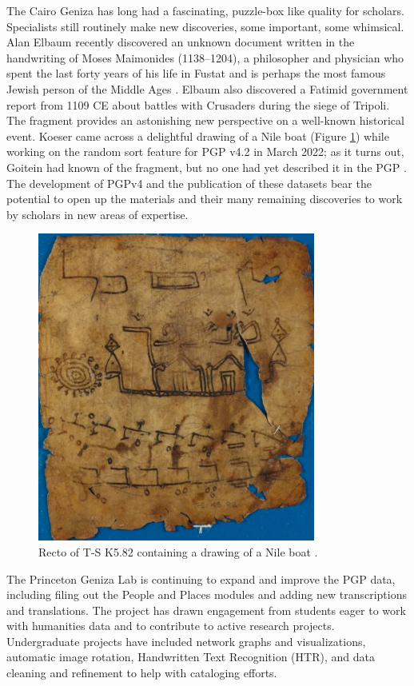 \documentclass{article}
\begin{document}
The Cairo Geniza has long had a fascinating, puzzle-box like quality for scholars. Specialists still routinely make new discoveries, some important, some whimsical. Alan Elbaum recently discovered an unknown document written in the handwriting of Moses Maimonides (1138–1204), a philosopher and physician who spent the last forty years of his life in Fustat and is perhaps the most famous Jewish person of the Middle Ages \autocite{ashur_new_2024, noauthor_list_nodate}. Elbaum also discovered a Fatimid government report from 1109 CE about battles with Crusaders during the siege of Tripoli. The fragment provides an astonishing new perspective on a well-known historical event\autocite{elbaum_franks_nodate}. Koeser came across a delightful drawing of a Nile boat (Figure \ref{fig:pgpid8483}) while working on the random sort feature for PGP v4.2 in March 2022; as it turns out, Goitein had known of the fragment, but no one had yet described it in the PGP \autocite{noauthor_paraliterary_nodate}. The development of PGPv4 and the publication of these datasets bear the potential to open up the materials and their many remaining discoveries to work by scholars in new areas of expertise. 

\begin{figure}[!hbt]
  \includegraphics[height=4in]{MS_TS-K-5-2_detail.jpg}
  \centering
  \caption{Recto of T-S K5.82 containing a drawing of a Nile boat \autocite{noauthor_paraliterary_nodate}.}
  \label{fig:pgpid8483}
\end{figure}

The Princeton Geniza Lab is continuing to expand and improve the PGP data, including filing out the People and Places modules and adding new transcriptions and translations. The project has drawn engagement from students eager to work with humanities data and to contribute to active research projects. Undergraduate projects have included network graphs and visualizations, automatic image rotation, Handwritten Text Recognition (HTR), and data cleaning and refinement to help with cataloging efforts. 
\end{document}

